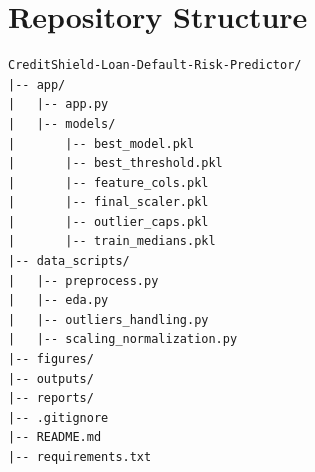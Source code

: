 \documentclass[12pt, a4paper]{article}
\begin{document}

\newpage

\section{Repository Structure}

\begin{verbatim}
CreditShield-Loan-Default-Risk-Predictor/
|-- app/
|   |-- app.py
|   |-- models/
|       |-- best_model.pkl
|       |-- best_threshold.pkl
|       |-- feature_cols.pkl
|       |-- final_scaler.pkl
|       |-- outlier_caps.pkl
|       |-- train_medians.pkl
|-- data_scripts/
|   |-- preprocess.py
|   |-- eda.py
|   |-- outliers_handling.py
|   |-- scaling_normalization.py
|-- figures/
|-- outputs/
|-- reports/
|-- .gitignore
|-- README.md
|-- requirements.txt
\end{verbatim}
\end{document}
